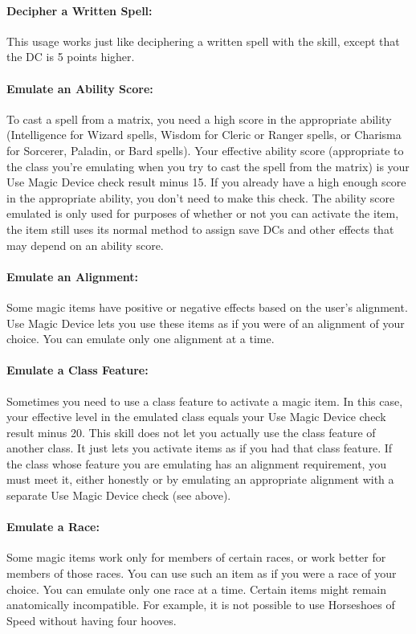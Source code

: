 \paragraph{Decipher a Written Spell:}
This usage works just like deciphering a written spell with the  skill, except that the DC is 5 points higher. 

\paragraph{Emulate an Ability Score:}
To cast a spell from a matrix, you need a high score in the appropriate ability (Intelligence for Wizard spells, Wisdom for Cleric or Ranger spells, or Charisma for Sorcerer, Paladin, or Bard spells). 
Your effective ability score (appropriate to the class you're emulating when you try to cast the spell from the matrix) is your Use Magic Device check result minus 15. If you already have a high enough score in the appropriate ability, you don't need to make this check.
The ability score emulated is only used for purposes of whether or not you can activate the item, the item still uses its normal method to assign save DCs and other effects that may depend on an ability score.

\paragraph{Emulate an Alignment:}
Some magic items have positive or negative effects based on the user's alignment. 
Use Magic Device lets you use these items as if you were of an alignment of your choice. 
You can emulate only one alignment at a time.

\paragraph{Emulate a Class Feature:}
Sometimes you need to use a class feature to activate a magic item. 
In this case, your effective level in the emulated class equals your Use Magic Device check result minus 20. 
This skill does not let you actually use the class feature of another class. 
It just lets you activate items as if you had that class feature. 
If the class whose feature you are emulating has an alignment requirement, you must meet it, either honestly or by emulating an appropriate alignment with a separate Use Magic Device check (see above).

\paragraph{Emulate a Race:}
Some magic items work only for members of certain races, or work better for members of those races. 
You can use such an item as if you were a race of your choice. 
You can emulate only one race at a time.
Certain items might remain anatomically incompatible. For example, it is not possible to use Horseshoes of Speed without having four hooves.

